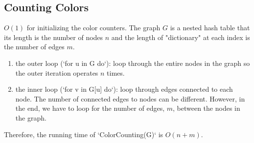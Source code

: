 \documentclass[11pt]{article}
\begin{document}
\subsection{Counting Colors}
$O(1)$ for initializing the color counters.
The graph $G$ is a nested hash table that its length is the number of nodes $n$ and the length of "dictionary" at each index is the number of edges $m$.

\begin{enumerate}[label=\arabic*.]
    \item the outer loop (`for u in G do`): loop through the entire nodes in the graph so the outer iteration operates $n$ times.
    \item the inner loop (`for v in G[u] do`): loop through edges connected to each node. The number of connected edges to nodes can be different. However, in the end, we have to loop for the number of edges, $m$, between the nodes in the graph.
\end{enumerate}

Therefore, the running time of `ColorCounting(G)` is $O(n+m)$.
\end{document}
